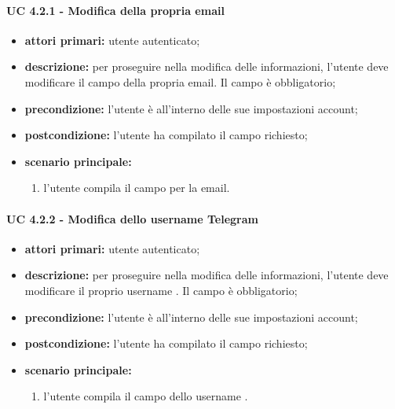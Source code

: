 				\paragraph{UC 4.2.1 - Modifica della propria email}
				\begin{itemize}
					\item \textbf{attori primari:} utente autenticato;
					\item \textbf{descrizione:} per proseguire nella modifica delle informazioni, l'utente deve modificare il campo della propria email. Il campo è obbligatorio;
					\item \textbf{precondizione:} l'utente è all'interno delle sue impostazioni account;
					\item \textbf{postcondizione:} l'utente ha compilato il campo richiesto;
					\item \textbf{scenario principale:}
					\begin{enumerate}
						\item l'utente compila il campo per la email.
					\end{enumerate}
				\end{itemize}

				\paragraph{UC 4.2.2 - Modifica dello username Telegram}
				\begin{itemize}
					\item \textbf{attori primari:} utente autenticato;
					\item \textbf{descrizione:} per proseguire nella modifica delle informazioni, l'utente deve modificare il proprio username . Il campo è obbligatorio;
					\item \textbf{precondizione:} l'utente è all'interno delle sue impostazioni account;
					\item \textbf{postcondizione:} l'utente ha compilato il campo richiesto;
					\item \textbf{scenario principale:}
					\begin{enumerate}
						\item l'utente compila il campo dello username .
					\end{enumerate}
				\end{itemize}


